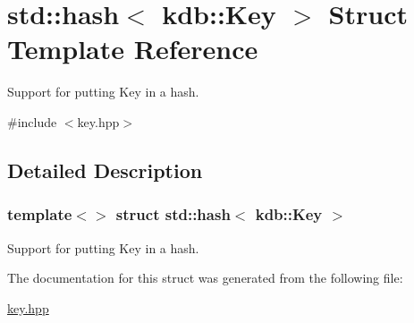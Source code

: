 \hypertarget{structstd_1_1hash_3_01kdb_1_1Key_01_4}{}\section{std\+:\+:hash$<$ kdb\+:\+:Key $>$ Struct Template Reference}
\label{structstd_1_1hash_3_01kdb_1_1Key_01_4}


Support for putting Key in a hash.  




{\ttfamily \#include $<$key.\+hpp$>$}



\subsection{Detailed Description}
\subsubsection*{template$<$$>$\newline
struct std\+::hash$<$ kdb\+::\+Key $>$}

Support for putting Key in a hash. 

The documentation for this struct was generated from the following file\+:\begin{DoxyCompactItemize}
\item 
\hyperlink{key_8hpp}{key.\+hpp}\end{DoxyCompactItemize}
